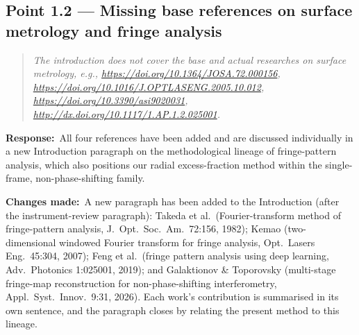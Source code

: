 \documentclass[11pt,a4paper]{article}
\newenvironment{reviewercomment}%
{\par\medskip\noindent\begin{quotation}\itshape\color{black!70}}%
{\end{quotation}\medskip}
\newcommand{\response}{\par\noindent\textbf{Response:}\ }
\newcommand{\changes}{\par\noindent\textbf{Changes made:}\ }
\begin{document}
\subsection*{Point 1.2 --- Missing base references on surface metrology and fringe analysis}
\begin{reviewercomment}
The introduction does not cover the base and actual researches on surface metrology, e.g., \url{https://doi.org/10.1364/JOSA.72.000156}, \url{https://doi.org/10.1016/J.OPTLASENG.2005.10.012}, \url{https://doi.org/10.3390/asi9020031}, \url{http://dx.doi.org/10.1117/1.AP.1.2.025001}.
\end{reviewercomment}
\response All four references have been added and are discussed individually in a new Introduction paragraph on the methodological lineage of fringe-pattern analysis, which also positions our radial excess-fraction method within the single-frame, non-phase-shifting family.
\changes A new paragraph has been added to the Introduction (after the instrument-review paragraph): Takeda et al.\ (Fourier-transform method of fringe-pattern analysis, J.~Opt.~Soc.~Am.\ 72:156, 1982); Kemao (two-dimensional windowed Fourier transform for fringe analysis, Opt.\ Lasers Eng.\ 45:304, 2007); Feng et al.\ (fringe pattern analysis using deep learning, Adv.\ Photonics 1:025001, 2019); and Galaktionov \& Toporovsky (multi-stage fringe-map reconstruction for non-phase-shifting interferometry, Appl.\ Syst.\ Innov.\ 9:31, 2026). Each work's contribution is summarised in its own sentence, and the paragraph closes by relating the present method to this lineage.
\end{document}
